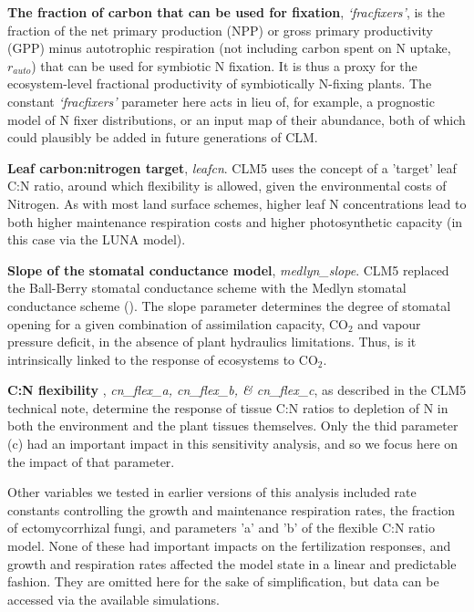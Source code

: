 \documentclass[draft,linenumbers]{agujournal}
\begin{document}
\textbf{The fraction of carbon that can be used for fixation}, \emph{`fracfixers'}, is the fraction of the net primary production (NPP) or gross primary productivity (GPP) minus autotrophic respiration (not including carbon spent on N uptake, $r_{auto}$) that can be used for symbiotic N fixation.  It is thus a proxy for the ecosystem-level fractional productivity of symbiotically N-fixing plants. The constant \emph{`fracfixers'} parameter here acts in lieu of, for example, a prognostic model of N fixer distributions, or an input map of their abundance, both of which could plausibly be added in future generations of CLM. 

\textbf{Leaf carbon:nitrogen target}, \emph{leafcn}. CLM5 uses the concept of a 'target' leaf C:N ratio, around which flexibility is allowed, given the environmental costs of Nitrogen. As with most land surface schemes, higher leaf N concentrations lead to both higher maintenance respiration costs and higher photosynthetic capacity (in this case via the LUNA model).  

\textbf{Slope of the stomatal conductance model}, \emph{medlyn\_slope}. CLM5 replaced the Ball-Berry stomatal conductance scheme with the Medlyn stomatal conductance scheme (\cite{medlyn2011}). The slope parameter determines the degree of stomatal opening for a given combination of assimilation capacity, CO$_{2}$ and vapour pressure deficit, in the absence of plant hydraulics limitations. Thus, is it intrinsically linked to the response of ecosystems to CO$_{2}$. 

\textbf{C:N flexibility }, \emph{cn\_flex\_a, cn\_flex\_b, \& cn\_flex\_c},  as described in the CLM5 technical note, determine the response of tissue C:N ratios to depletion of N in both the environment and the plant tissues themselves. Only the thid parameter (c) had an important impact in this sensitivity analysis, and so we focus here on the impact of that parameter. 

Other variables we tested in earlier versions of this analysis included rate constants controlling the growth and maintenance respiration rates, the fraction of ectomycorrhizal fungi, and parameters 'a' and 'b' of the flexible C:N ratio model. None of these had important impacts on the fertilization responses, and growth and respiration rates affected the model state in a linear and predictable fashion. They are omitted here for the sake of simplification, but data can be accessed via the available simulations. 
\end{document}
